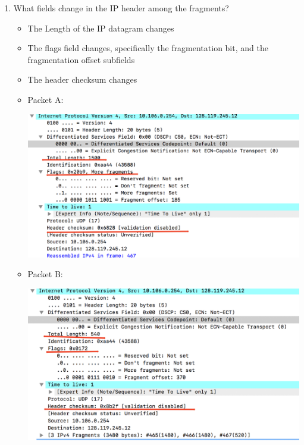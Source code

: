 \documentclass{article}
\begin{document}
\begin{enumerate}
      \item What fields change in the IP header among the fragments?
        \begin{itemize}
          \item The Length of the IP datagram changes
          \item The flags field changes, specifically the fragmentation bit, and the fragmentation offset subfields
          \item The header checksum changes
          \item Packet A:\par\includegraphics[scale=0.5]{images/IP15a.png}
          \item Packet B:\par\includegraphics[scale=0.5]{images/IP15b.png}
          
        \end{itemize}
  \end{enumerate}
\end{document}
